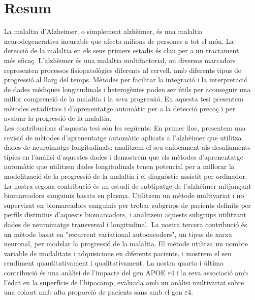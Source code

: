 \documentclass[12pt, b5paper,twoside]{tesi_upf}
\begin{document}
\vspace*{\fill}
\section*{\Large \sffamily  Resum}
La malaltia d'Alzheimer, o simplement alzhèimer, és una malaltia neurodegenerativa incurable que afecta milions de persones a tot el món. La detecció de la malaltia en els seus primers estadis és clau per a un tractament més eficaç. L’alzhèimer és una malaltia multifactorial, on diversos marcadors representen processos fisiopatològics diferents al cervell, amb diferents tipus de progressió al llarg del temps. Mètodes per facilitar la integració i la interpretació de dades mèdiques longitudinals i heterogènies poden ser útils per aconseguir una millor comprensió de la malaltia i la seva progressió. En aquesta tesi presentem mètodes estadístics i d’aprenentatge automàtic per a la detecció precoç i per avaluar la progressió de la malaltia. \\

Les contribucions d’aquesta tesi són les següents: En primer lloc, presentem una revisió de mètodes d’aprenentatge automàtic aplicats a l'alzhèimer que utilitza dades de neuroimatge longitudinals: analitzem el seu enfocament als desafiaments típics en l’anàlisi d'aquestes dades i demostrem que els mètodes d’aprenentatge automàtic que utilitzen dades longitudinals tenen potencial per a millorar la modelització de la progressió de la malaltia i el diagnòstic assistit per ordinador. La nostra segona contribució és un estudi de subtipatge de l'alzhèimer mitjançant biomarcadors sanguinis basats en plasma. Utilitzem un mètode multivariat i no supervisat en biomarcadors sanguinis per trobar subgrups de pacients definits per perfils distintius d'aquests biomarcadors, i analitzem aquests subgrups utilitzant dades de neuroimatge transversal i longitudinal. La nostra tercera contribució és un mètode basat en "recurrent variational autoencoders", un tipus de xarxa neuronal, per modelar la progressió de la malaltia. El mètode utilitza un nombre variable de modalitats i adquisicions en diferents pacients, i mostrem el seu rendiment quantitativament i qualitativament. La nostra quarta i última contribució és una anàlisi de l’impacte del gen APOE $\varepsilon4$ i la seva associació amb l’edat en la superfície de l’hipocamp, evaluada amb un anàlisi multivariat sobre una cohort amb alta proporció de pacients sans amb el gen $\varepsilon4$.
\vspace*{\fill}
\end{document}

